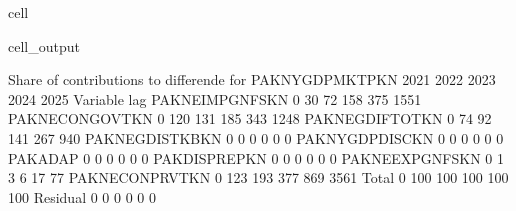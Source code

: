 \documentclass[letterpaper,10pt,english]{jupyterBook}
\begin{document}
\begin{sphinxuseclass}{cell}
\begin{sphinxVerbatimOutput}
\begin{sphinxuseclass}{cell_output}
\begin{sphinxVerbatim}[commandchars=\\\{\}]
 Share of contributions to differende for  PAKNYGDPMKTPKN
                          2021        2022        2023        2024        2025
Variable       lag                                                            
PAKNEIMPGNFSKN 0           30\PYGZpc{}         72\PYGZpc{}        158\PYGZpc{}        375\PYGZpc{}       1551\PYGZpc{}
PAKNECONGOVTKN 0          120\PYGZpc{}        131\PYGZpc{}        185\PYGZpc{}        343\PYGZpc{}       1248\PYGZpc{}
PAKNEGDIFTOTKN 0           74\PYGZpc{}         92\PYGZpc{}        141\PYGZpc{}        267\PYGZpc{}        940\PYGZpc{}
PAKNEGDISTKBKN 0           \PYGZhy{}0\PYGZpc{}         \PYGZhy{}0\PYGZpc{}         \PYGZhy{}0\PYGZpc{}         \PYGZhy{}0\PYGZpc{}         \PYGZhy{}0\PYGZpc{}
PAKNYGDPDISCKN 0           \PYGZhy{}0\PYGZpc{}         \PYGZhy{}0\PYGZpc{}         \PYGZhy{}0\PYGZpc{}         \PYGZhy{}0\PYGZpc{}         \PYGZhy{}0\PYGZpc{}
PAKADAP        0           \PYGZhy{}0\PYGZpc{}         \PYGZhy{}0\PYGZpc{}         \PYGZhy{}0\PYGZpc{}         \PYGZhy{}0\PYGZpc{}         \PYGZhy{}0\PYGZpc{}
PAKDISPREPKN   0           \PYGZhy{}0\PYGZpc{}         \PYGZhy{}0\PYGZpc{}         \PYGZhy{}0\PYGZpc{}         \PYGZhy{}0\PYGZpc{}         \PYGZhy{}0\PYGZpc{}
PAKNEEXPGNFSKN 0           \PYGZhy{}1\PYGZpc{}         \PYGZhy{}3\PYGZpc{}         \PYGZhy{}6\PYGZpc{}        \PYGZhy{}17\PYGZpc{}        \PYGZhy{}77\PYGZpc{}
PAKNECONPRVTKN 0         \PYGZhy{}123\PYGZpc{}       \PYGZhy{}193\PYGZpc{}       \PYGZhy{}377\PYGZpc{}       \PYGZhy{}869\PYGZpc{}      \PYGZhy{}3561\PYGZpc{}
Total          0          100\PYGZpc{}        100\PYGZpc{}        100\PYGZpc{}        100\PYGZpc{}        100\PYGZpc{}
Residual       0           \PYGZhy{}0\PYGZpc{}         \PYGZhy{}0\PYGZpc{}         \PYGZhy{}0\PYGZpc{}         \PYGZhy{}0\PYGZpc{}         \PYGZhy{}0\PYGZpc{}


\end{sphinxVerbatim}
\end{sphinxuseclass}
\end{sphinxVerbatimOutput}
\end{sphinxuseclass}
\end{document}
